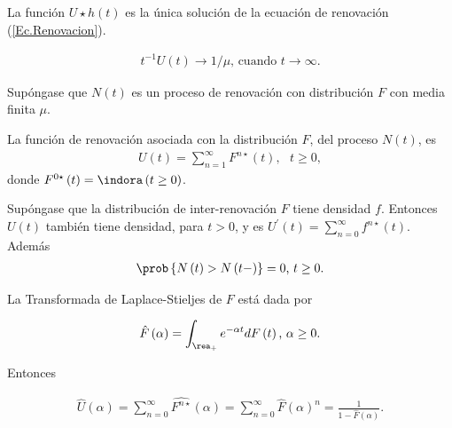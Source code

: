 \begin{Prop}
La funci\'on $U\star h\left(t\right)$ es la \'unica soluci\'on de la ecuaci\'on de renovaci\'on (\ref{Ec.Renovacion}).
\end{Prop}

\begin{Teo}
\begin{eqnarray*}
t^{-1}U\left(t\right)\rightarrow 1/\mu\textrm{,    cuando }t\rightarrow\infty.
\end{eqnarray*}
\end{Teo}



Sup\'ongase que $N\left(t\right)$ es un proceso de renovaci\'on con distribuci\'on $F$ con media finita $\mu$.

\begin{Def}
La funci\'on de renovaci\'on asociada con la distribuci\'on $F$, del proceso $N\left(t\right)$, es
\begin{eqnarray*}
U\left(t\right)=\sum_{n=1}^{\infty}F^{n\star}\left(t\right),\textrm{   }t\geq0,
\end{eqnarray*}
donde $F^{0\star}\left(t\right)=\indora\left(t\geq0\right)$.
\end{Def}


\begin{Prop}
Sup\'ongase que la distribuci\'on de inter-renovaci\'on $F$ tiene densidad $f$. Entonces $U\left(t\right)$ tambi\'en tiene densidad, para $t>0$, y es $U^{'}\left(t\right)=\sum_{n=0}^{\infty}f^{n\star}\left(t\right)$. Adem\'as
\begin{eqnarray*}
\prob\left\{N\left(t\right)>N\left(t-\right)\right\}=0\textrm{,   }t\geq0.
\end{eqnarray*}
\end{Prop}

\begin{Def}
La Transformada de Laplace-Stieljes de $F$ est\'a dada por

\begin{eqnarray*}
\hat{F}\left(\alpha\right)=\int_{\rea_{+}}e^{-\alpha t}dF\left(t\right)\textrm{,  }\alpha\geq0.
\end{eqnarray*}
\end{Def}

Entonces

\begin{eqnarray*}
\hat{U}\left(\alpha\right)=\sum_{n=0}^{\infty}\hat{F^{n\star}}\left(\alpha\right)=\sum_{n=0}^{\infty}\hat{F}\left(\alpha\right)^{n}=\frac{1}{1-\hat{F}\left(\alpha\right)}.
\end{eqnarray*}


